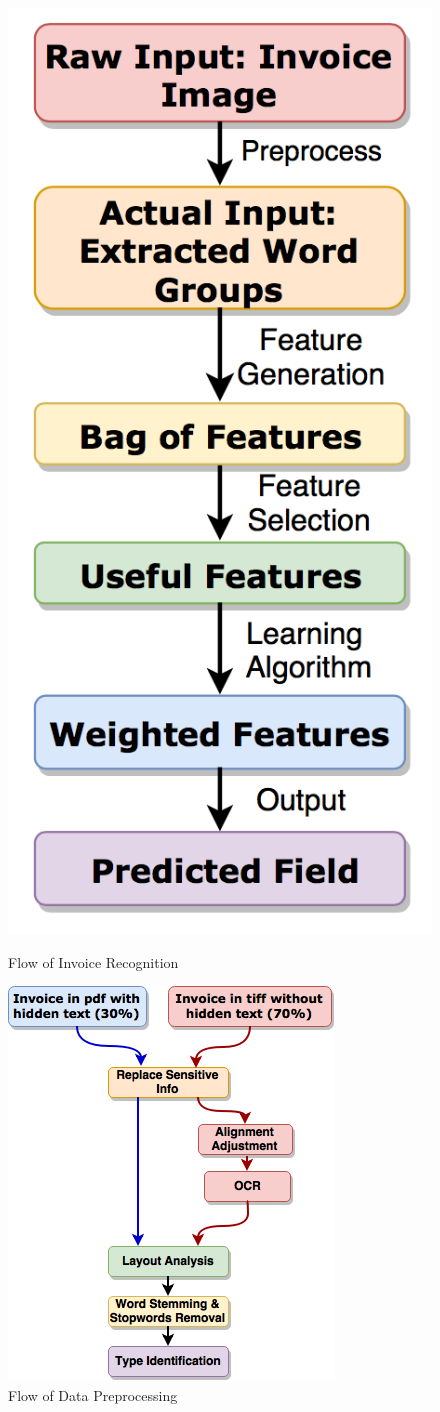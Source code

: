 \begin{figure}
\centering
\begin{minipage}{.5\linewidth}
  \centering
  \includegraphics[width=.5\linewidth]{flow_1}
  \caption{Flow of Invoice Recognition}
  \label{fig:flow1}
\end{minipage}%
\begin{minipage}{.5\linewidth}
  \centering
  \includegraphics[width=.9\linewidth]{flow}
  \caption{Flow of Data Preprocessing}
  \label{fig:flow2}
\end{minipage}
\end{figure}
